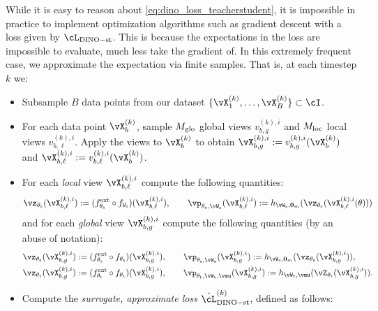 \documentclass[\toplevelprefix/book-main.tex]{subfiles}
\begin{document}
While it is easy to reason about \eqref{eq:dino_loss_teacherstudent}, it is impossible in practice to implement optimization algorithms such as gradient descent with a loss given by \(\cL_{\dino{}-\student\teacher}\). This is because the expectations in the loss are impossible to evaluate, much less take the gradient of. In this extremely frequent case, we approximate the expectation via finite samples. That is, at each timestep \(k\) we:
\begin{itemize}
    \item Subsample \(B\) data points from our dataset \(\{\vX_{1}^{(k)}, \dots, \vX_{B}^{(k)}\} \subset \cI\).
    \item For each data point \(\vX_{b}^{(k)}\), sample \(M_{\mathrm{glo}}\) global views \(v_{b, g}^{(k), i}\) and \(M_{\mathrm{loc}}\) local views \(v_{b, \ell}^{(k), i}\). Apply the views to \(\vX_{b}^{(k)}\) to obtain \(\vX_{b, g}^{(k), i} := v_{b, g}^{(k), i}(\vX_{b}^{(k)})\) and \(\vX_{b, \ell}^{(k), i} := v_{b, \ell}^{(k), i}(\vX_{b}^{(k)})\).
    \item For each \textit{local} view \(\vX_{b, \ell}^{(k), i}\) compute the following quantities:
    \begin{equation}
        \vz_{\theta_{\student}}(\vX_{b, \ell}^{(k), i}) := (f_{\theta_{\student}}^{\ext} \circ f_{\theta_{\student}})(\vX_{b, \ell}^{(k), i}), \qquad \vp_{\theta_{\student}, \vW_{\student}}(\vX_{b, \ell}^{(k), i}) := h_{\vW_{\student}, \vzero_{m}}(\vz_{\theta_{\student}}(\vX_{b, \ell}^{(k), i}(\theta)))
    \end{equation}
    and for each \textit{global} view \(\vX_{b, g}^{(k), i}\) compute the following quantities (by an abuse of notation):
    \begin{align}
        &\vz_{\theta_{\student}}(\vX_{b, g}^{(k), i}) := (f_{\theta_{\student}}^{\ext} \circ f_{\theta_{\student}})(\vX_{b, g}^{(k), i}), \qquad \vp_{\theta_{\student}, \vW_{\student}}(\vX_{b, g}^{(k), i}) := h_{\vW_{\student}, \vzero_{m}}(\vz_{\theta_{\student}}(\vX_{b, g}^{(k), i})), \\
        &\vz_{\theta_{\teacher}}(\vX_{b, g}^{(k), i}) := (f_{\theta_{\teacher}}^{\ext} \circ f_{\theta_{\teacher}})(\vX_{b, g}^{(k), i}), \qquad \vp_{\theta_{\teacher}, \vW_{\teacher}, \vmu}(\vX_{b, g}^{(k), i}) := h_{\vW_{\teacher}, \vmu}(\vZ_{\theta_{\teacher}}(\vX_{b, g}^{(k), i})).
    \end{align}
    \item Compute the \textit{surrogate, approximate loss} \(\hat{\cL}_{\dino-\student\teacher}^{(k)}\), defined as follows: 

\end{itemize}
\end{document}
